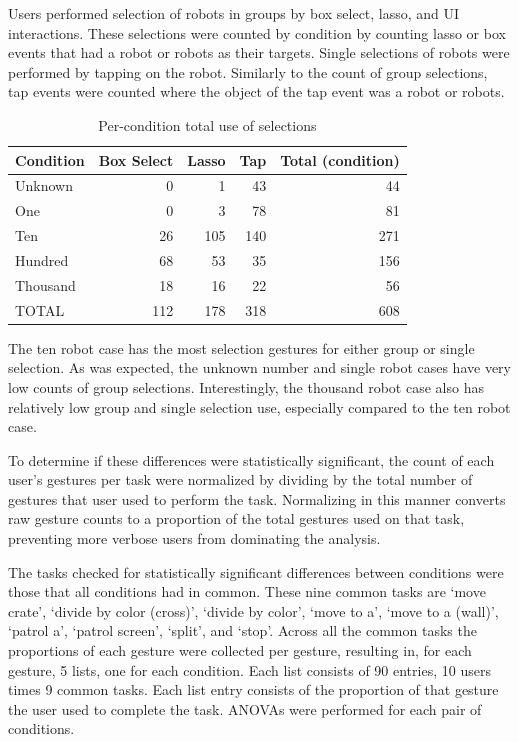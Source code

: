 Users performed selection of robots in groups by box select, lasso, and UI interactions.
These selections were counted by condition by counting lasso or box events that had a robot or robots as their targets. 
Single selections of robots were performed by tapping on the robot. 
Similarly to the count of group selections, tap events were counted where the object of the tap event was a robot or robots. 


\begin{table}
	\centering
	\begin{tabular}{l r r r r}
		Condition & Box Select & Lasso & Tap & Total (condition)\\
		\hline
		Unknown & 0 & 1 & 43 & 44 \\
		One & 0 & 3 & 78 & 81\\
		Ten & 26 & 105 & 140 & 271\\
		Hundred & 68 & 53 & 35 & 156\\
		Thousand & 18 & 16 & 22 & 56\\
		\hline
		TOTAL & 112 & 178 & 318 & 608\\
	\end{tabular}
	\caption{Per-condition total use of selections}
\end{table}


The ten robot case has the most selection gestures for either group or single selection. 
As was expected, the unknown number and single robot cases have very low counts of group selections. 
Interestingly, the thousand robot case also has relatively low group and single 
selection use, especially compared to the ten robot case. 

To determine if these differences were statistically significant, the count of each user's gestures per task were normalized by dividing by the total number of gestures that user used to perform the task. 
Normalizing in this manner converts raw gesture counts to a proportion of the total gestures used on that task, preventing more verbose users from dominating the analysis.

The tasks checked for statistically significant differences between conditions were those that all conditions had in common. 
These nine common tasks are `move crate', `divide by color (cross)', `divide by color', `move to a', `move to a (wall)', `patrol a', `patrol screen', `split', and `stop'. 
Across all the common tasks the proportions of each gesture were collected per gesture, resulting in, for each gesture, 5 lists, one for each condition. Each list consists of 90 entries, 10 users times 9 common tasks. Each list entry consists of the proportion of that gesture the user used to complete the task. ANOVAs were performed for each pair of conditions. 

